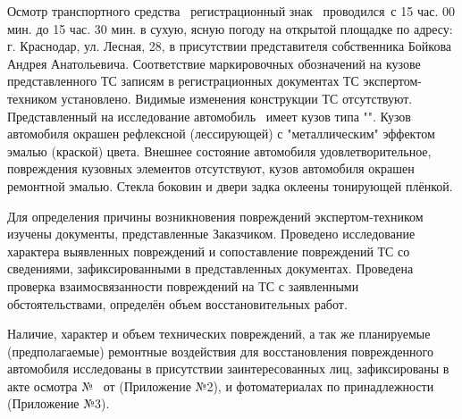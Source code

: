 \noindent \begin{spacing}{1.2} { Осмотр транспортного средства \, регистрационный знак  \, проводился \osm\,с 15 час. 00 мин. до 15 час. 30 мин. в сухую, ясную погоду  на открытой площадке по адресу: г. Краснодар, ул. Лесная, 28, в присутствии представителя собственника Бойкова Андрея Анатольевича. %
Соответствие маркировочных обозначений на кузове представленного ТС записям в регистрационных документах ТС экс\-пертом-техником установлено. Видимые изменения конструкции ТС отсутствуют.  Представленный на исследование автомобиль \tc\, имеет кузов типа "". Кузов автомобиля окрашен  рефлексной (лессирующей) с "металлическим" эффектом 
эмалью (краской) \colr цвета. Внешнее состояние автомобиля удовлетворительное, повреждения  кузовных элементов отсутствуют, кузов автомобиля окрашен ремонтной эмалью.  Стекла боковин и двери задка  оклеены тонирующей плёнкой. %
\par Для определения причины возникновения повреждений %
экспертом-техником изучены документы, представленные Заказчиком.  %
Проведено исследование характера выявленных повреждений и сопоставление повреждений ТС  
со сведениями, зафиксированными в представленных документах. %
Проведена проверка взаимосвязанности повреждений на ТС с заявленными обстоятельствами, определён объем восстановительных работ.%
\par Наличие, характер и объем технических повреждений, а так же  планируемые (предполагаемые) ремонтные воздействия для восстановления поврежденного автомобиля  исследованы в присутствии заинтересованных лиц, зафиксированы в акте осмотра № \NomerDoc \,  от \osm  (Приложение №2),  и фотоматериалах по принадлежности (Приложение №3).  }
\end{spacing}
%
